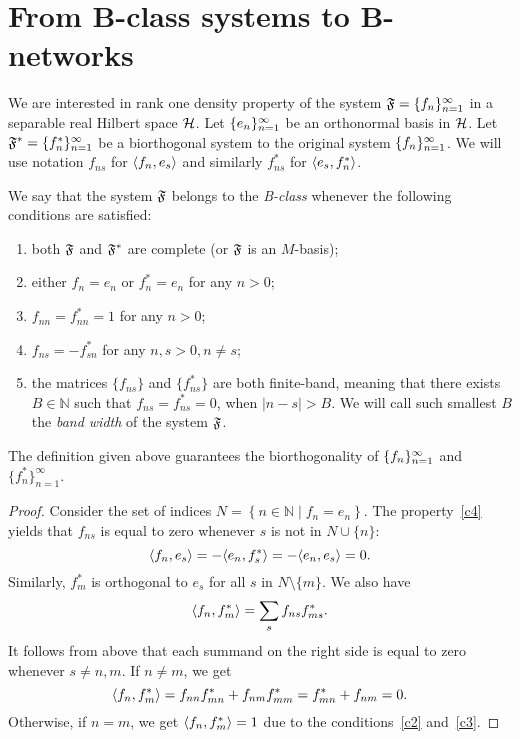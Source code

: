 \documentclass[12pt,oneside,a4paper]{amsart}
\begin{document}
\section{From B-class systems to B-networks}
    \label{sec:refor}
    \label{fsys2graphs}
    We are interested in rank one density property of the system $\fsys = \seq{f}$
      in a separable real Hilbert space $\cal{H}$.
    Let $\seq{e}$ be an orthonormal basis in $\cal{H}$.
    Let $\fstarsys = \{f_n^{*}\}_{n=1}^\infty$ be a biorthogonal system to the original system $\seq{f}$.
    We will use notation $f_{ns}$ for $\inner{f_n}{e_s}$ and similarly $f^*_{ns}$ for $\inner{e_s}{f^*_n}$.
    \begin{definition}
      We say that the system $\fsys$ belongs to the \emph{B-class} whenever the following conditions are satisfied:
      \begin{enumerate}[label=\textbf{C\arabic*}]
        \item \label{c1} both $\fsys$ and $\fstarsys$ are complete (or $\fsys$ is an $M$-basis);
        \item \label{c2} either $f_n = e_n$ or $f^*_n = e_n$ for any $n > 0$;
        \item \label{c3} $f_{nn} = f^*_{nn} = 1$ for any $n > 0$;
        \item \label{c4} $f_{ns} = -f^*_{sn}$ for any $n, s > 0, n \neq s$;
        \item \label{c5} the matrices $\{f_{ns}\}$ and $\{f^*_{ns}\}$ are both finite-band,
            meaning that there exists $B \in \mathbb{N}$ such that $f_{ns} = f^*_{ns} = 0$, when $\lvert n - s \rvert > B$.
          We will call such smallest $B$ the \emph{band width} of the system $\fsys$.
      \end{enumerate}
    \end{definition}
    \begin{prop}
      The definition given above guarantees the biorthogonality of $\seq{f}$ and $\{f^*_n\}_{n=1}^\infty$.
    \end{prop}
    \begin{proof}
      Consider the set of indices $N = \left\{n \in \mathbb{N} \mid f_n = e_n \right\}$.
      The property~\ref{c4} yields that $f_{ns}$ is equal to zero whenever $s$ is not in $N \cup \{n\}$:
      \[
        \inner{f_n}{e_s} = -\inner{e_n}{f^*_s} = -\inner{e_n}{e_s} = 0.
      \]
      Similarly, $f^*_m$ is orthogonal to $e_s$ for all $s$ in $N \setminus \{m\}$.
      We also have
      \[
        \inner{f_n}{f^*_m} = \sum_{s} f_{ns} f_{ms}^*.
      \]
      It follows from above that each summand on the right side is equal to zero whenever $s \neq n, m$.
      If $n \neq m$, we get
      \[
        \inner{f_n}{f^*_m} = f_{nn} f^*_{mn} + f_{nm} f^*_{mm}
        = f^*_{mn} + f_{nm} = 0.
      \]
      Otherwise, if $n = m$, we get $\inner{f_n}{f^*_m} = 1$ due to the conditions~\ref{c2} and~\ref{c3}.
    \end{proof}
\end{document}
